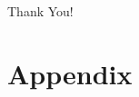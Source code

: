 \documentclass[aspectratio=169, t]{beamer}
\begin{document}
\begin{frame}[c]
    \begin{center}
    	\Large Thank You!
    \end{center}
\end{frame}


\appendix

\renewcommand\thetable{\thesection.\arabic{table}} 
\renewcommand\thefigure{\thesection.\arabic{figure}} 
\setcounter{table}{0}
\setcounter{figure}{0}

\section{Appendix}
\end{document}
